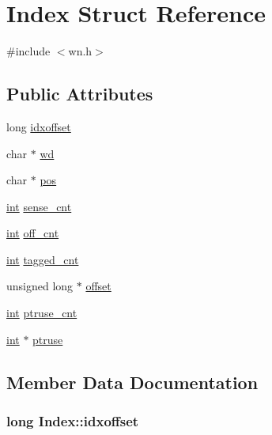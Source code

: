 \hypertarget{struct_index}{}\section{Index Struct Reference}
\label{struct_index}


{\ttfamily \#include $<$wn.\+h$>$}

\subsection*{Public Attributes}
\begin{DoxyCompactItemize}
\item 
long \hyperlink{struct_index_aa58b6c13e494b8b076a576f4218b54b8}{idxoffset}
\item 
char $\ast$ \hyperlink{struct_index_ac836b68129dd28ed751e34b28701f6d2}{wd}
\item 
char $\ast$ \hyperlink{struct_index_ac14f4a78de133597a538b4c5a653171f}{pos}
\item 
\hyperlink{tk_8h_a83f82f76e7fed06f4c49d2db94028a6d}{int} \hyperlink{struct_index_a5b08ae094c1311cf18490673ab27721c}{sense\+\_\+cnt}
\item 
\hyperlink{tk_8h_a83f82f76e7fed06f4c49d2db94028a6d}{int} \hyperlink{struct_index_af0f57fedd585897131dc29950dd6c84d}{off\+\_\+cnt}
\item 
\hyperlink{tk_8h_a83f82f76e7fed06f4c49d2db94028a6d}{int} \hyperlink{struct_index_ad039685d966a205dfedc4de92469621c}{tagged\+\_\+cnt}
\item 
unsigned long $\ast$ \hyperlink{struct_index_a6f12f7b36fe11a906efd16d5e85fca42}{offset}
\item 
\hyperlink{tk_8h_a83f82f76e7fed06f4c49d2db94028a6d}{int} \hyperlink{struct_index_a37820a4bcfd41466390618e3b685416c}{ptruse\+\_\+cnt}
\item 
\hyperlink{tk_8h_a83f82f76e7fed06f4c49d2db94028a6d}{int} $\ast$ \hyperlink{struct_index_ae3a68cdff947c09c59fdbe09c8fa3cd5}{ptruse}
\end{DoxyCompactItemize}


\subsection{Member Data Documentation}
\subsubsection[{\texorpdfstring{idxoffset}{idxoffset}}]{\setlength{\rightskip}{0pt plus 5cm}long Index\+::idxoffset}\hypertarget{struct_index_aa58b6c13e494b8b076a576f4218b54b8}{}\label{struct_index_aa58b6c13e494b8b076a576f4218b54b8}

